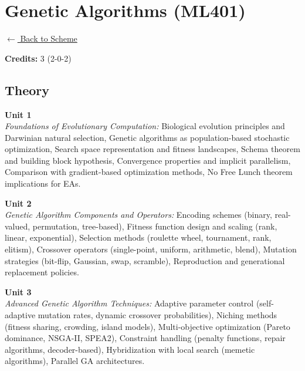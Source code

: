 \section*{Genetic Algorithms (ML401)}
\label{major:ML_4}

\noindent \small{\hyperref[main:scheme]{$\leftarrow$ Back to Scheme}} \vspace{0.5cm}

\noindent \textbf{Credits:} 3 (2-0-2)

\subsection*{Theory}
\noindent\textbf{Unit 1} \\
\textit{Foundations of Evolutionary Computation:} Biological evolution principles and Darwinian natural selection, Genetic algorithms as population-based stochastic optimization, Search space representation and fitness landscapes, Schema theorem and building block hypothesis, Convergence properties and implicit parallelism, Comparison with gradient-based optimization methods, No Free Lunch theorem implications for EAs.

\vspace{0.3cm}

\noindent\textbf{Unit 2} \\
\textit{Genetic Algorithm Components and Operators:} Encoding schemes (binary, real-valued, permutation, tree-based), Fitness function design and scaling (rank, linear, exponential), Selection methods (roulette wheel, tournament, rank, elitism), Crossover operators (single-point, uniform, arithmetic, blend), Mutation strategies (bit-flip, Gaussian, swap, scramble), Reproduction and generational replacement policies.

\vspace{0.3cm}

\noindent\textbf{Unit 3} \\
\textit{Advanced Genetic Algorithm Techniques:} Adaptive parameter control (self-adaptive mutation rates, dynamic crossover probabilities), Niching methods (fitness sharing, crowding, island models), Multi-objective optimization (Pareto dominance, NSGA-II, SPEA2), Constraint handling (penalty functions, repair algorithms, decoder-based), Hybridization with local search (memetic algorithms), Parallel GA architectures.

\vspace{0.3cm}

